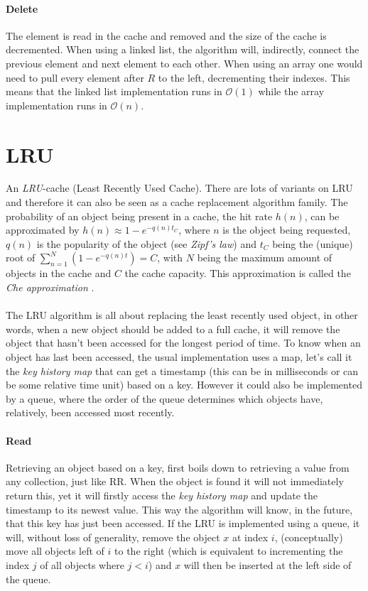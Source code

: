 \documentclass[pdftex,a4paper,12pt,twoside]{report}
\begin{document}
\paragraph{Delete} The element is read in the cache and removed and the size of the cache is decremented. When using a linked list, the algorithm will, indirectly, connect the previous element and next element to each other. When using an array one would need to pull every element after $R$ to the left, decrementing their indexes. This means that the linked list implementation runs in $\mathcal{O}(1)$ while the array implementation runs in $\mathcal{O}(n)$.
\section{LRU}
An \emph{LRU}-cache (Least Recently Used Cache). There are lots of variants on LRU and therefore it can also be seen as a cache replacement algorithm family. The probability of an object being present in a cache, the hit rate $h(n)$, can be approximated by 
$h(n) \approx 1 - e^{-q(n)t_C}$, where $n$ is the object being requested, $q(n)$ is the popularity of the object (see \emph{Zipf's law}) and $t_C$ being the (unique) root of 
$\sum_{n=1}^N(1-e^{-q(n)t})=C$, with $N$ being the maximum amount of objects in the cache and $C$ the cache capacity. This approximation is called the \emph{Che approximation} \citep{fricker2012versatile}.
\\\\
The LRU algorithm is all about replacing the least recently used object, in other words, when a new object should be added to a full cache, it will remove the object that hasn't been accessed for the longest period of time. To know when an object has last been accessed, the usual implementation uses a map, let's call it the \emph{key history map} that can get a timestamp (this can be in milliseconds or can be some relative time unit) based on a key. However it could also be implemented by a queue, where the order of the queue determines which objects have, relatively, been accessed most recently.
\paragraph{Read} Retrieving an object based on a key, first boils down to retrieving a value from any collection, just like RR. When the object is found it will not immediately return this, yet it will firstly access the \emph{key history map} and update the timestamp to its newest value. This way the algorithm will know, in the future, that this key has just been accessed. If the LRU is implemented using a queue, it will, without loss of generality, remove the object $x$ at index $i$, (conceptually) move all objects left of $i$ to the right (which is equivalent to incrementing the index $j$ of all objects where $j < i$) and $x$ will then be inserted at the left side of the queue.
\end{document}
